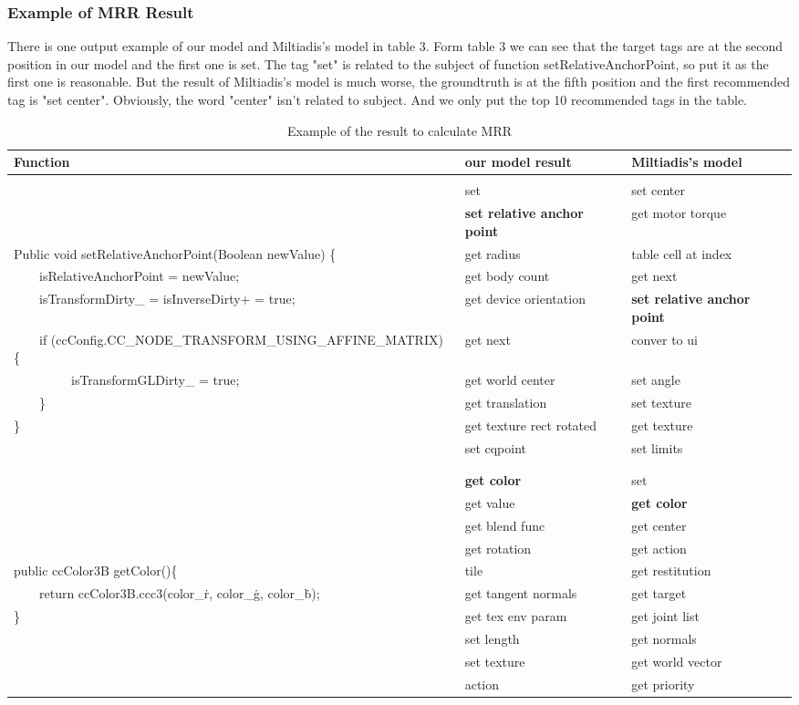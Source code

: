 \subsubsection{Example of MRR Result}
There is one output example of our model and Miltiadis's model in table 3. Form table 3 we can see that the target tags are at the second position in our model and the first one is set. The tag "set" is related to the subject of function setRelativeAnchorPoint, so put it as the first one is reasonable. But the result of Miltiadis's model is much worse, the groundtruth is at the fifth position and the first recommended tag is "set center". Obviously, the word "center" isn't related to subject. And we only put the top 10 recommended tags in the table.
\begin{table}[!htbp]
    \centering
    \caption{ Example of the result to calculate MRR  }
    \begin{tabular} {|p{10cm}|p{3cm}|p{3cm}|}
    \hline
    Function & our model result & Miltiadis's model\\
    \hline
    & & \\
    & set & set center\\
    & \textbf{set relative anchor point} & get motor torque \\
    Public void setRelativeAnchorPoint(Boolean newValue) \{ &get radius & table cell at index\\
    \  \ \  \  isRelativeAnchorPoint = newValue; & get body count & get next\\
    \  \ \  \  isTransformDirty\_ = isInverseDirty+ = true;  & get device orientation & \textbf{set relative anchor point} \\
	\  \ \  \ if (ccConfig.CC\_NODE\_TRANSFORM\_USING\_AFFINE\_MATRIX) \{ & get next & conver to ui\\
	\  \ \  \ \  \ \  \ \	isTransformGLDirty\_ = true;  & get world center & set angle \\
	\  \ \  \  \}   &  get translation & set texture \\
    \} & get texture rect rotated & get texture \\
    & set cqpoint & set limits \\
    & & \\
    \hline

    & & \\
& \textbf{get color} & set \\
& get value & \textbf{get color}\\
& get blend func & get center \\
& get rotation & get action \\
    public ccColor3B getColor()\{ & tile & get restitution \\
    \  \ \  \ return ccColor3B.ccc3(color\_\.r, color\_\.g, color\_\.b); & get tangent normals & get target \\
    \} & get tex env param& get joint list \\
& set length & get normals \\
& set texture & get world vector\\
& action & get priority\\


\end{tabular}
\end{table}
